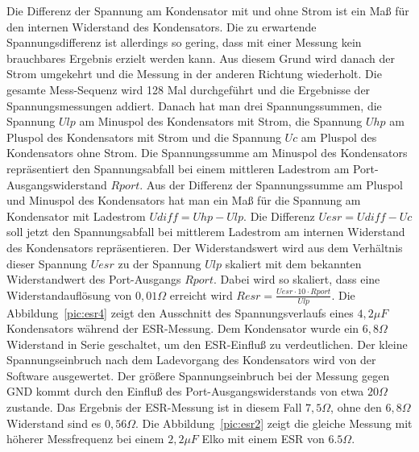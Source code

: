Die Differenz der Spannung am Kondensator mit und ohne Strom ist ein Maß für den internen Widerstand des Kondensators.
Die zu erwartende Spannungsdifferenz ist allerdings so gering, dass mit einer Messung kein brauchbares Ergebnis erzielt
werden kann.
Aus diesem Grund wird danach der Strom umgekehrt und die Messung in der anderen Richtung wiederholt.
Die gesamte Mess-Sequenz wird 128 Mal durchgeführt und die Ergebnisse der Spannungsmessungen addiert.
Danach hat man drei Spannungssummen, die Spannung \(Ulp\) am Minuspol des Kondensators mit Strom, die Spannung \(Uhp\) am
Pluspol des Kondensators mit Strom und die Spannung \(Uc\) am Pluspol des Kondensators ohne Strom.
Die Spannungssumme am Minuspol des Kondensators repräsentiert den Spannungsabfall bei einem mittleren
Ladestrom am Port-Ausgangswiderstand \(Rport\). Aus der Differenz der Spannungssumme am Pluspol und Minuspol des Kondensators
hat man ein Maß für die Spannung am Kondensator mit Ladestrom \(Udiff = Uhp - Ulp\).
Die Differenz \(Uesr = Udiff - Uc\) soll jetzt den Spannungsabfall bei mittlerem Ladestrom am internen Widerstand des Kondensators
repräsentieren.
Der Widerstandswert wird aus dem Verhältnis dieser Spannung \(Uesr\) zu der Spannung \(Ulp\) skaliert mit dem
bekannten Widerstandwert des Port-Ausgangs \(Rport\). Dabei wird so skaliert, dass eine Widerstandauflösung von
\(0,01 \Omega\) erreicht wird \(Resr = \frac{Uesr \cdot 10 \cdot Rport}{Ulp}\).
Die Abbildung~\ref{pic:esr4} zeigt den Ausschnitt des Spannungsverlaufs eines \(4,2\mu F\) Kondensators
 während der ESR-Messung. Dem Kondensator wurde ein \(6,8 \Omega\) Widerstand in Serie geschaltet, um den ESR-Einfluß
zu verdeutlichen. Der kleine Spannungseinbruch nach dem Ladevorgang des Kondensators wird von der Software ausgewertet.
Der größere Spannungseinbruch bei der Messung gegen GND kommt durch den Einfluß des Port-Ausgangswiderstands von etwa \(20 \Omega\) zustande.
Das Ergebnis der ESR-Messung ist in diesem Fall \(7,5 \Omega\), ohne den \(6,8 \Omega\) Widerstand sind es \(0,56 \Omega\).
Die Abbildung~\ref{pic:esr2} zeigt die gleiche Messung mit höherer Messfrequenz bei einem \(2,2 \mu F\) Elko mit einem ESR von \(6.5 \Omega\).



